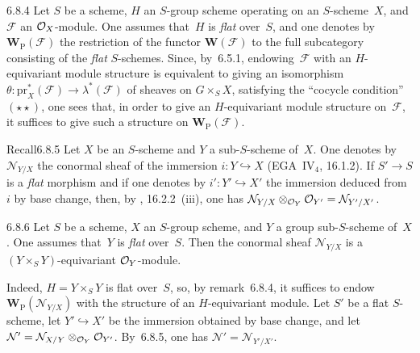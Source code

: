 \begin{remark}{6.8.4}\label{I.6.8.4}
Let \(S\) be a scheme, \(H\) an \(S\)-group scheme operating on an
\(S\)-scheme~\(X\), and \(\mathcal{F}\) an \(\mathcal{O}_X\)-module. One assumes
that~\(H\) is \emph{flat} over~\(S\), and one denotes by
\(\mathbf{W}_{\mathrm{P}}(\mathcal{F})\) the restriction of the functor
\(\mathbf{W}(\mathcal{F})\) to the full subcategory consisting of the
\emph{flat} \(S\)-schemes.
Since, by~6.5.1, endowing~\(\mathcal{F}\) with an \(H\)-equivariant module
structure is equivalent to giving an isomorphism
\(\theta\colon\mathrm{pr}_X^*(\mathcal{F})\to\lambda^*(\mathcal{F})\) of
sheaves on \(G\times_S X\), satisfying the ``cocycle condition''
\((\star\star)\), one sees that, in order to give an \(H\)-equivariant
module structure on~\(\mathcal{F}\), it suffices to give such a structure
on \(\mathbf{W}_{\mathrm{P}}(\mathcal{F})\).
\end{remark}

\begin{enonce}{Recall}{6.8.5}\label{I.6.8.5}
Let \(X\) be an \(S\)-scheme and \(Y\) a sub-\(S\)-scheme of~\(X\). One denotes
by \(\mathcal{N}_{Y/X}\) the conormal sheaf of the immersion
\(i\colon Y\hookrightarrow X\) (\cf EGA~IV\(_4\), 16.1.2). If \(S'\to S\) is a
\emph{flat} morphism and if one denotes by \(i'\colon Y'\hookrightarrow X'\)
the immersion deduced from~\(i\) by base change, then, by \loccit,
16.2.2~(iii), one has
\(\mathcal{N}_{Y/X}\otimes_{\mathcal{O}_Y}\mathcal{O}_{Y'}=\mathcal{N}_{Y'/X'}\).
\end{enonce}

\begin{proposition}{6.8.6}\label{I.6.8.6}
Let \(S\) be a scheme, \(X\) an \(S\)-group scheme, and \(Y\) a group
sub-\(S\)-scheme of~\(X\). One assumes that~\(Y\) is \emph{flat} over~\(S\).
Then the conormal sheaf \(\mathcal{N}_{Y/X}\) is a
\((Y\times_S Y)\)-equivariant \(\mathcal{O}_Y\)-module.
\end{proposition}

Indeed, \(H=Y\times_S Y\) is flat over~\(S\), so, by remark~6.8.4, it
suffices to endow \(\mathbf{W}_{\mathrm{P}}(\mathcal{N}_{Y/X})\) with the
structure of an \(H\)-equivariant module. Let \(S'\) be a flat \(S\)-scheme,
let \(Y'\hookrightarrow X'\) be the immersion obtained by base change, and
let \(\mathcal{N}'=\mathcal{N}_{X/Y}\otimes_{\mathcal{O}_Y}\mathcal{O}_{Y'}\).
By~6.8.5, one has \(\mathcal{N}'=\mathcal{N}_{Y'/X'}\).

